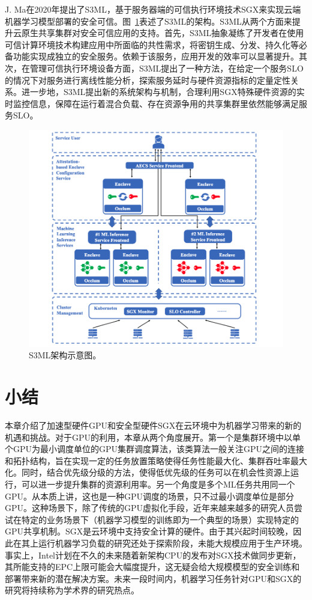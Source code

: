 J. Ma在2020年提出了S3ML\parencite{ma2020s3ml}，基于服务器端的可信执行环境技术SGX来实现云端机器学习模型部署的安全可信。图~\ref{s3ml_arch}表述了S3ML的架构。S3ML从两个方面来提升云原生共享集群对安全可信应用的支持。首先，S3ML抽象凝练了开发者在使用可信计算环境技术构建应用中所面临的共性需求，将密钥生成、分发、持久化等必备功能实现成独立的安全服务。依赖于该服务，应用开发的效率可以显著提升。其次，在管理可信执行环境设备方面，S3ML提出了一种方法，在给定一个服务SLO的情况下对服务进行离线性能分析，探索服务延时与硬件资源指标的定量定性关系。进一步地，S3ML提出新的系统架构与机制，合理利用SGX特殊硬件资源的实时监控信息，保障在运行着混合负载、存在资源争用的共享集群里依然能够满足服务SLO。

\begin{figure}[h]
    \centerline{\includegraphics[width=\textwidth]{figures/s3ml-arch.png}}
    \caption{S3ML架构示意图。}
    \label{s3ml_arch}
\end{figure}

\section{小结}
本章介绍了加速型硬件GPU和安全型硬件SGX在云环境中为机器学习带来的新的机遇和挑战。对于GPU的利用，本章从两个角度展开。第一个是集群环境中以单个GPU为最小调度单位的GPU集群调度算法，该类算法一般关注GPU之间的连接和拓扑结构，旨在实现一定的任务放置策略使得任务性能最大化、集群吞吐率最大化。同时，结合优先级分级的方法，使得低优先级的任务可以在机会性资源上运行，可以进一步提升集群的资源利用率。另一个角度是多个ML任务共用同一个GPU。从本质上讲，这也是一种GPU调度的场景，只不过最小调度单位是部分GPU。这种场景下，除了传统的GPU虚拟化手段，近年来越来越多的研究人员尝试在特定的业务场景下（机器学习模型的训练即为一个典型的场景）实现特定的GPU共享机制。SGX是云环境中支持安全计算的硬件。由于其兴起时间较晚，因此在其上运行机器学习负载的研究还处于探索阶段，未能大规模应用于生产环境。事实上，Intel计划在不久的未来随着新架构CPU的发布对SGX技术做同步更新，其所能支持的EPC上限可能会大幅度提升，这无疑会给大规模模型的安全训练和部署带来新的潜在解决方案。未来一段时间内，机器学习任务针对GPU和SGX的研究将持续称为学术界的研究热点。
